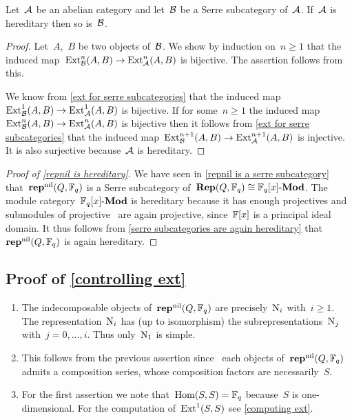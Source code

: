 \documentclass[a4paper,11pt]{scrartcl}
\begin{document}
\begin{corollary}
  \label{serre subcategories are again hereditary}
  Let~$\mathcal{A}$ be an abelian category and let~$\mathcal{B}$ be a Serre subcategory of~$\mathcal{A}$.
  If~$\mathcal{A}$ is hereditary then so is~$\mathcal{B}$.
\end{corollary}

\begin{proof}
  Let~$A$,~$B$ be two objects of~$\mathcal{B}$.
  We show by induction on~$n \geq 1$ that the induced map~$\operatorname{Ext}^n_{\mathcal{B}}(A,B) \to \operatorname{Ext}^n_{\mathcal{A}}(A,B)$ is bijective.
  The assertion follows from this.

  We know from \cref{ext for serre subcategories} that the induced map~$\operatorname{Ext}^1_{\mathcal{B}}(A,B) \to \operatorname{Ext}^1_{\mathcal{A}}(A,B)$ is bijective.
  If for some~$n \geq 1$ the induced map~$\operatorname{Ext}^n_{\mathcal{B}}(A,B) \to \operatorname{Ext}^n_{\mathcal{A}}(A,B)$ is bijective then it follows from \cref{ext for serre subcategories} that the induced map~$\operatorname{Ext}^{n+1}_{\mathcal{B}}(A,B) \to \operatorname{Ext}^{n+1}_{\mathcal{A}}(A,B)$ is injective.
  It is also surjective because~$\mathcal{A}$ is hereditary.
\end{proof}

\begin{proof}[Proof of \cref{repnil is hereditary}]
  We have seen in \cref{repnil is a serre subcategory} that~$\mathbf{rep}^{\mathrm{nil}}(Q, \mathbb{F}_q)$ is a Serre subcategory of~$\mathbf{Rep}(Q, \mathbb{F}_q) \cong \mathbb{F}_q[x]\textrm{-}\mathbf{Mod}$.
  The module category~$\mathbb{F}_q[x]\textrm{-}\mathbf{Mod}$ is hereditary because it has enough projectives and submodules of projective~ are again projective, since~$\mathbb{F}[x]$ is a principal ideal domain.
  It thus follows from \cref{serre subcategories are again hereditary} that~$\mathbf{rep}^{\mathrm{nil}}(Q, \mathbb{F}_q)$ is again hereditary.
\end{proof}



\subsection{Proof of \cref{controlling ext}}
\label{proof of controlling ext}

\begin{enumerate}
  \item
    The indecomposable objects of~$\mathbf{rep}^{\mathrm{nil}}(Q, \mathbb{F}_q)$ are precisely~$\mathrm{N}_i$ with~$i \geq 1$.
    The representation~$\mathrm{N}_i$ has (up to isomorphism) the subrepresentations~$\mathrm{N}_j$ with~$j = 0, \dotsc, i$.
    Thus only~$\mathrm{N}_1$ is simple.
  \item
    This follows from the previous assertion since~ each objects of~$\mathbf{rep}^{\mathrm{nil}}(Q, \mathbb{F}_q)$ admits a composition series, whose composition factors are necessarily~$S$.
  \item      
    For the first assertion we note that~$\operatorname{Hom}(S, S) = \mathbb{F}_q$ because~$S$ is one-dimensional.      
    For the computation of~$\operatorname{Ext}^1(S,S)$ see \cref{computing ext}.
  \qedhere
\end{enumerate}
\end{document}
